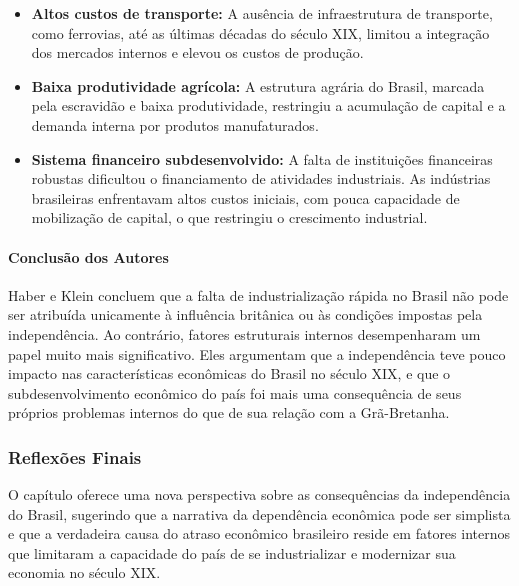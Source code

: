 \documentclass[a4paper,12pt]{article}[abntex2]
\begin{document}
\begin{itemize}
    \item \textbf{Altos custos de transporte:} A ausência de infraestrutura de transporte, como ferrovias, até as últimas décadas do século XIX, limitou a integração dos mercados internos e elevou os custos de produção.
    \item \textbf{Baixa produtividade agrícola:} A estrutura agrária do Brasil, marcada pela escravidão e baixa produtividade, restringiu a acumulação de capital e a demanda interna por produtos manufaturados.
    \item \textbf{Sistema financeiro subdesenvolvido:} A falta de instituições financeiras robustas dificultou o financiamento de atividades industriais. As indústrias brasileiras enfrentavam altos custos iniciais, com pouca capacidade de mobilização de capital, o que restringiu o crescimento industrial.
\end{itemize}

\paragraph*{Conclusão dos Autores}
Haber e Klein concluem que a falta de industrialização rápida no Brasil não pode ser atribuída unicamente à influência britânica ou às condições impostas pela independência. Ao contrário, fatores estruturais internos desempenharam um papel muito mais significativo. Eles argumentam que a independência teve pouco impacto nas características econômicas do Brasil no século XIX, e que o subdesenvolvimento econômico do país foi mais uma consequência de seus próprios problemas internos do que de sua relação com a Grã-Bretanha.

\subsubsection*{Reflexões Finais}
O capítulo oferece uma nova perspectiva sobre as consequências da independência do Brasil, sugerindo que a narrativa da dependência econômica pode ser simplista e que a verdadeira causa do atraso econômico brasileiro reside em fatores internos que limitaram a capacidade do país de se industrializar e modernizar sua economia no século XIX.
\end{document}
